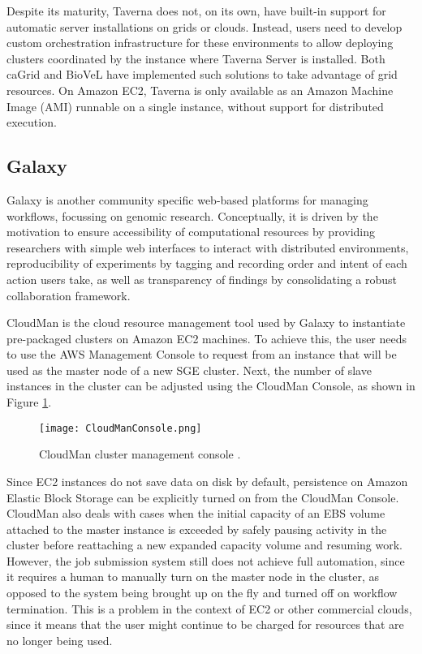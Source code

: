 Despite its maturity, Taverna does not, on its own, have built-in support for automatic server installations on grids or clouds. Instead, users need to develop custom orchestration infrastructure for these environments to allow deploying clusters coordinated by the instance where Taverna Server is installed. Both caGrid \cite{caGrid} and BioVeL \cite{BioVeL} have implemented such solutions \cite{TavernaGrid, Donvito} to take advantage of grid resources. On Amazon EC2, Taverna is only available as an Amazon Machine Image (AMI) runnable on a single instance, without support for distributed execution.

\subsection{Galaxy}

Galaxy \cite{Goecks2010} is another community specific web-based platforms for managing workflows, focussing on genomic research. Conceptually, it is driven by the motivation to ensure accessibility of computational resources by providing researchers with simple web interfaces to interact with distributed environments, reproducibility of experiments by tagging and recording order and intent of each action users take, as well as transparency of findings by consolidating a robust collaboration framework.

CloudMan \cite{Afgan2010} is the cloud resource management tool used by Galaxy to instantiate pre-packaged clusters on Amazon EC2 machines. To achieve this, the user needs to use the AWS Management Console to request from an instance that will be used as the master node of a new SGE cluster. Next, the number of slave instances in the cluster can be adjusted using the CloudMan Console, as shown in Figure \ref{CloudManConsole}.

\begin{figure}[h]
	\centering
		\texttt{[image: CloudManConsole.png]}
	\caption{CloudMan cluster management console \cite{Afgan2010}.}
	\label{CloudManConsole}
\end{figure}

Since EC2 instances do not save data on disk by default, persistence on Amazon Elastic Block Storage can be explicitly turned on from the CloudMan Console. CloudMan also deals with cases when the initial capacity of an EBS volume attached to the master instance is exceeded by safely pausing activity in the cluster before reattaching a new expanded capacity volume and resuming work. However, the job submission system still does not achieve full automation, since it requires a human to manually turn on the master node in the cluster, as opposed to the system being brought up on the fly and turned off on workflow termination. This is a problem in the context of EC2 or other commercial clouds, since it means that the user might continue to be charged for resources that are no longer being used.

